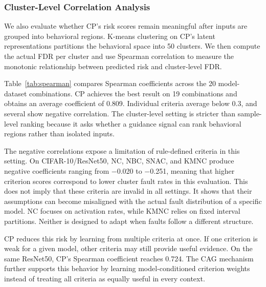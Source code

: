 \documentclass[preprint,number,5p,twocolumn]{elsarticle}
\begin{document}
\subsubsection{Cluster-Level Correlation Analysis}

We also evaluate whether CP's risk scores remain meaningful after inputs are grouped into behavioral regions. K-means clustering on CP's latent representations partitions the behavioral space into 50 clusters. We then compute the actual FDR per cluster and use Spearman correlation to measure the monotonic relationship between predicted risk and cluster-level FDR.

Table~\ref{tab:spearman} compares Spearman coefficients across the 20 model-dataset combinations. CP achieves the best result on 19 combinations and obtains an average coefficient of 0.809. Individual criteria average below 0.3, and several show negative correlation. The cluster-level setting is stricter than sample-level ranking because it asks whether a guidance signal can rank behavioral regions rather than isolated inputs.

The negative correlations expose a limitation of rule-defined criteria in this setting. On CIFAR-10/ResNet50, NC, NBC, SNAC, and KMNC produce negative coefficients ranging from $-$0.020 to $-$0.251, meaning that higher criterion scores correspond to lower cluster fault rates in this evaluation. This does not imply that these criteria are invalid in all settings. It shows that their assumptions can become misaligned with the actual fault distribution of a specific model. NC focuses on activation rates, while KMNC relies on fixed interval partitions. Neither is designed to adapt when faults follow a different structure.

CP reduces this risk by learning from multiple criteria at once. If one criterion is weak for a given model, other criteria may still provide useful evidence. On the same ResNet50, CP's Spearman coefficient reaches 0.724. The CAG mechanism further supports this behavior by learning model-conditioned criterion weights instead of treating all criteria as equally useful in every context.
\end{document}
